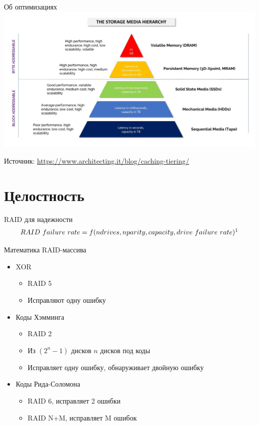 \documentclass[aspectratio=169]{beamer}
\begin{document}
\begin{frame}{Об оптимизациях}
    \centering
    \includegraphics[scale=0.25]{fig/9.tiering.jpg}
    
    \tiny Источник: \url{https://www.architecting.it/blog/caching-tiering/}
\end{frame}

\section{Целостность}

\begin{frame}{RAID для надежности}
\raid
\begin{align*}
    RAID\ failure\ rate = f(ndrives, nparity, capacity, drive\ failure\ rate)\footnotemark
\end{align*}
\end{frame}

\begin{frame}{Математика RAID-массива}
    \begin{itemize}
        \item XOR
        \begin{itemize}
            \item RAID 5
            \item Исправляют одну ошибку
        \end{itemize}
        \item Коды Хэмминга
        \begin{itemize}
            \item RAID 2
            \item Из $(2^n - 1)$ дисков $n$ дисков под коды
            \item Исправляет одну ошибку, обнаруживает двойную ошибку 
        \end{itemize}
        \item Коды Рида-Соломона
        \begin{itemize}
            \item RAID 6, исправляет 2 ошибки
            \item RAID N+M, исправляет M ошибок
        \end{itemize}
    \end{itemize}
\end{frame}
\end{document}
